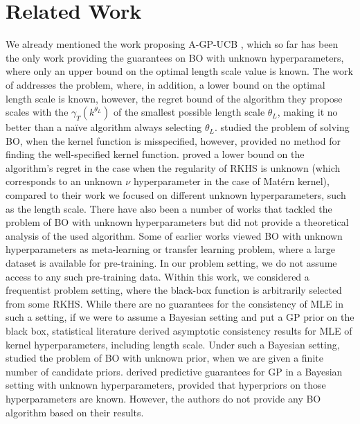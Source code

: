 \documentclass{article}
\theoremstyle{plain}
\theoremstyle{definition}
\theoremstyle{remark}
\theoremstyle{plain}
\begin{document}
\section{Related Work}
We already mentioned the work proposing A-GP-UCB \cite{berkenkamp2019no}, which so far has been the only work providing the guarantees on BO with unknown hyperparameters, where only an upper bound on the optimal length scale value is known. The work of \cite{wang2014theoretical} addresses the problem, where, in addition, a lower bound on the optimal length scale is known, however, the regret bound of the algorithm they propose scales with the $\gamma_T(k^{\theta_L})$ of the smallest possible length scale $\theta_L$, making it no better than a naïve algorithm always selecting $\theta_L$. \cite{bogunovic2021misspecified} studied the problem of solving BO, when the kernel function is misspecified, however, provided no method for finding the well-specified kernel function.  \cite{liu2023adaptation} proved a lower bound on the algorithm's regret in the case when the regularity of RKHS is unknown (which corresponds to an unknown $\nu$ hyperparameter in the case of Matérn kernel), compared to their work we focused on different unknown hyperparameters, such as the length scale.
 There have also been a number of works \cite{de2021bayesian, hvarfner2023self, lizotte2008practical, osborne2009gaussian} that tackled the problem of BO with unknown hyperparameters but did not provide a theoretical analysis of the used algorithm. Some of earlier works \cite{feurer2015initializing, wang2018regret} viewed BO with unknown hyperparameters as meta-learning or transfer learning problem, where a large dataset is available for pre-training. In our problem setting, we do not assume access to any such pre-training data.
Within this work, we considered a frequentist problem setting, where the black-box function is arbitrarily selected from some RKHS. While there are no guarantees for the consistency of MLE  in such a setting, if we were to assume a Bayesian setting and put a GP prior on the black box, statistical literature derived asymptotic consistency results \cite{bachoc2013cross, kaufman2013role,li2022bayesian, mardia1984maximum} for MLE of kernel hyperparameters, including length scale. Under such a Bayesian setting, \cite{ziomek2024timevaryinggaussianprocessbandits} studied the problem of BO with unknown prior, when we are given a finite number of candidate priors. \cite{capone2022gaussian} derived predictive guarantees for GP in a Bayesian setting with unknown hyperparameters, provided that hyperpriors on those hyperparameters are known. However, the authors do not provide any BO algorithm based on their results.
\end{document}
